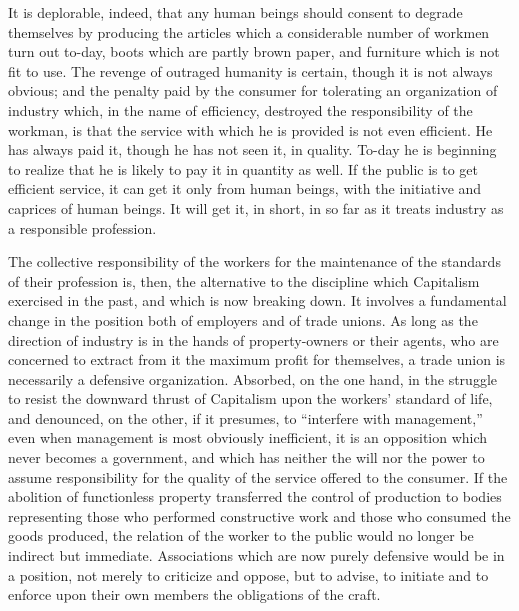 \documentclass{book}
\begin{document}
It is deplorable, indeed, that any human beings should consent to degrade themselves by producing the articles which a considerable number of workmen turn out to-day, boots which are partly brown paper, and furniture which is not fit to use. The revenge of outraged humanity is certain, though it is not always obvious; and the penalty paid by the consumer for tolerating an organization of industry which, in the name of efficiency, destroyed the responsibility of the workman, is that the service with which he is provided is not even efficient. He has always paid it, though he has not seen it, in quality. To-day he is beginning to realize that he is likely to pay it in quantity as well. If the public is to get efficient service, it can get it only from human beings, with the initiative and caprices of human beings. It will get it, in short, in so far as it treats industry as a responsible profession.

The collective responsibility of the workers for the maintenance of the standards of their profession is, then, the alternative to the discipline which Capitalism exercised in the past, and which is now breaking down. It involves a fundamental change in the position both of employers and of trade unions. As long as the direction of industry is in the hands of property-owners or their agents, who are concerned to extract from it the maximum profit for themselves, a trade union is necessarily a defensive organization. Absorbed, on the one hand, in the struggle to resist the downward thrust of Capitalism upon the workers’ standard of life, and denounced, on the other, if it presumes, to “interfere with management,” even when management is most obviously inefficient, it is an opposition which never becomes a government, and which has neither the will nor the power to assume responsibility for the quality of the service offered to the consumer. If the abolition of functionless property transferred the control of production to bodies representing those who performed constructive work and those who consumed the goods produced, the relation of the worker to the public would no longer be indirect but immediate. Associations which are now purely defensive would be in a position, not merely to criticize and oppose, but to advise, to initiate and to enforce upon their own members the obligations of the craft.
\end{document}
